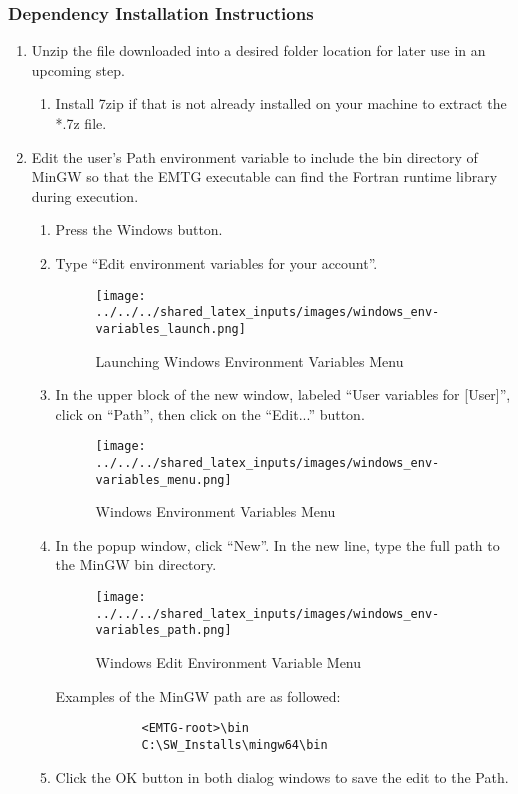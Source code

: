 \subsubsection{Dependency Installation Instructions}
\label{sec:mingw_installation_instructions}
\begin{enumerate}
	\item Unzip the file downloaded into a desired folder location for later use in an upcoming step. 
	\begin{enumerate}
		\item Install 7zip if that is not already installed on your machine to extract the *.7z file. 
	\end{enumerate}	
	\item \label{bundle:mingw} Edit the user’s Path environment variable to include the bin directory of MinGW so that the EMTG executable can find the Fortran runtime library during execution.
	\begin{enumerate}
		\item Press the Windows button.
		\item Type “Edit environment variables for your account”. %
		\begin{figure}[H]
			\centering
			\texttt{[image: ../../../shared\_latex\_inputs/images/windows\_env-variables\_launch.png]}
			\caption{Launching Windows Environment Variables Menu}
		\end{figure}
		\item In the upper block of the new window, labeled “User variables for [User]”, click on “Path”, then click on the “Edit...” button. 
		\begin{figure}[H]
			\centering
			\texttt{[image: ../../../shared\_latex\_inputs/images/windows\_env-variables\_menu.png]}
			\caption{Windows Environment Variables Menu}
		\end{figure}
		\item In the popup window, click “New”. In the new line, type the full path to the MinGW bin directory. 
		\begin{figure}[H]
			\centering
			\texttt{[image: ../../../shared\_latex\_inputs/images/windows\_env-variables\_path.png]}
			\caption{Windows Edit Environment Variable Menu}
		\end{figure}
		Examples of the MinGW path are as followed: 
		\begin{verbatim}
			<EMTG-root>\bin
			C:\SW_Installs\mingw64\bin
		\end{verbatim}
		\item Click the OK button in both dialog windows to save the edit to the Path.
	\end{enumerate}		
\end{enumerate}

